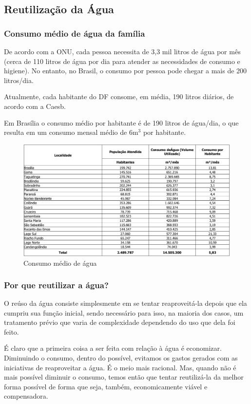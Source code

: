\subsection{Reutilização da Água}
\subsubsection{Consumo médio de água da família}

	De acordo com a \gls{ONU}, cada pessoa necessita de 3,3 mil litros de água por mês (cerca de 110 litros de água por dia para atender as necessidades de consumo e higiene). No entanto, no Brasil, o consumo por pessoa pode chegar a mais de 200 litros/dia. 

	Atualmente, cada habitante do DF consome, em média, 190 litros diários, de acordo com a \gls{Caesb}. 

	Em Brasília o consumo médio por habitante é de 190 litros de água/dia, o que resulta em um consumo mensal médio de 6m$^{3}$ por habitante.
\begin{figure}
\centering
\includegraphics[keepaspectratio,scale=0.3]{images/table1.png}
\caption{Consumo médio de água \cite{table1}}

\end{figure}

\subsubsection{Por que reutilizar a água?}

	O reúso da água consiste simplesmente em se tentar reaproveitá-la depois que ela cumpriu sua função inicial, sendo necessário para isso, na maioria dos casos, um tratamento prévio que varia de complexidade dependendo do uso que dela foi feito.

	É claro que a primeira coisa a ser feita com relação à água é economizar. Diminuindo o consumo, dentro do possível, evitamos os gastos gerados com as iniciativas de reaproveitar a água. É o meio mais racional. Mas, quando não é mais possível diminuir o consumo, temos então que tentar reutilizá-la da melhor forma possível de forma que seja, também, economicamente viável e compensadora.

